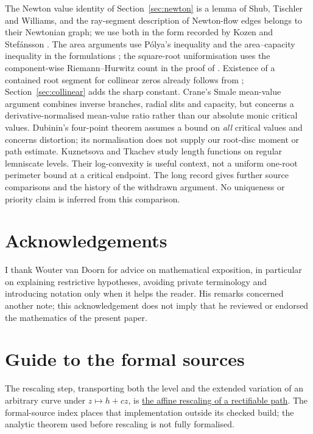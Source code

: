 \documentclass[11pt]{article}
\begin{document}
The Newton value identity of Section~\ref{sec:newton} is a lemma of Shub,
Tischler and Williams, and the ray-segment description of Newton-flow edges
belongs to their Newtonian graph; we use both in the form recorded by Kozen and
Stef\'ansson \cite[Lemmas~2.1--2.2 and \S2]{kozen-stefansson1997}.  The area
arguments use P\'olya's inequality and the area--capacity inequality in the
formulations \cite[Theorems~1 and~6]{crane}; the square-root uniformisation
uses the component-wise Riemann--Hurwitz count in the proof of
\cite[Proposition~2.1]{eks2010}.  Existence of a contained root segment for
collinear zeros already follows from \cite[Theorem~1]{ehp1958};
Section~\ref{sec:collinear} adds the sharp constant.
Crane's Smale mean-value argument \cite[Lemma~2.1, Theorem~2.2 and
\S\S3--4]{crane2007smale} combines inverse branches, radial slits and
capacity, but concerns a derivative-normalised mean-value ratio rather than
our absolute monic critical values.  Dubinin's four-point theorem
\cite[Theorem~1 and Corollary~4]{dubinin2013fourpoint} assumes a bound on
\emph{all} critical values and concerns distortion; its normalisation does
not supply our root-disc moment or path estimate.  Kuznetsova and Tkachev
\cite[Theorems~1--2]{kuznetsova2003} study length functions on regular
lemniscate levels.  Their log-convexity is useful context, not a uniform
one-root perimeter bound at a critical endpoint.
The long record gives further source comparisons and the history of the
withdrawn argument. No uniqueness or priority claim is inferred from this
comparison.

\section*{Acknowledgements}
I thank Wouter van Doorn for advice on mathematical exposition, in particular
on explaining restrictive hypotheses, avoiding private terminology and
introducing notation only when it helps the reader. His remarks concerned
another note; this acknowledgement does not imply that he reviewed or
endorsed the mathematics of the present paper.

\appendix
\section{Guide to the formal sources}\label{app:sources}

The rescaling step, transporting both the level and the
extended variation of an arbitrary curve under $z\mapsto h+cz$, is
\href{https://github.com/wcook04/plectis-erdos/blob/f36a98bf3d3e6f65f1074e3b800e3293d5b8a51a/ErdosProblems/Erdos1041/PaperMetricScaling.lean#L40}{the affine rescaling of a rectifiable path}. The formal-source index places
that implementation outside its checked build; the analytic theorem used
before rescaling is not fully formalised.
\end{document}

